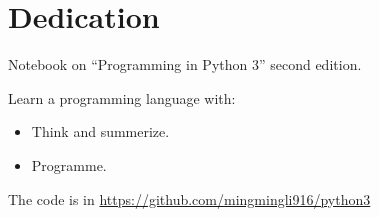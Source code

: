 \chapter*{Dedication}

Notebook on ``Programming in Python 3'' second edition.


Learn a programming language with:
\begin{itemize}
\item Think and summerize.
\item Programme.
\end{itemize}


The code is in \url{https://github.com/mingmingli916/python3}


